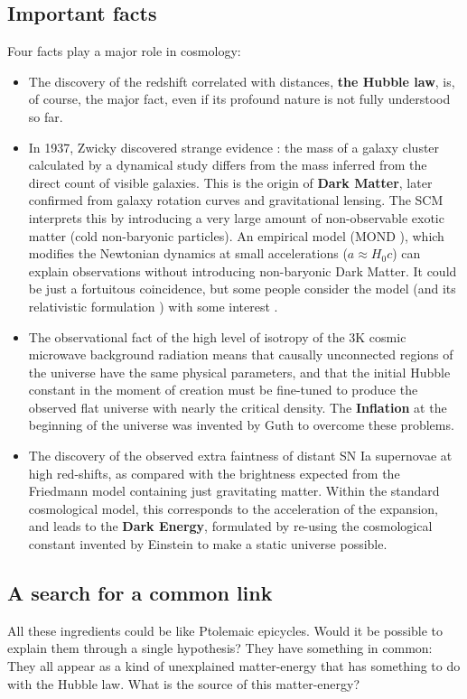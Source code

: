 \subsection{Important facts }
\label{sec5.2}
Four facts  play a major role in cosmology: 
\begin{itemize}
\item The discovery of the redshift correlated with distances, {\bf{the Hubble law}},  is, of course, the major fact, even if its profound nature is not fully understood so far.

\item In 1937, Zwicky discovered strange evidence  \cite{zwicky} : the mass of a galaxy cluster calculated by a dynamical study differs from the mass inferred from the direct count of visible galaxies. This is the origin of  {\bf {Dark Matter}}, later confirmed from galaxy rotation curves and gravitational lensing. The SCM interprets this  by introducing a very large amount of non-observable exotic matter (cold non-baryonic particles). 
An empirical model (MOND  \cite{mond}), which modifies the Newtonian dynamics at small accelerations ($a \approx H_0 c$) can explain observations without introducing non-baryonic Dark Matter. It could be just a fortuitous coincidence, but some people consider the model (and its relativistic formulation \cite{beken}) with some interest \cite{blanchet}.

\item The observational fact of the high level of isotropy of the 3K cosmic microwave background radiation means that causally unconnected regions of the universe have the same physical parameters,  and that the initial Hubble constant in the moment of creation must be fine-tuned to produce the observed  {{flat universe}}  with nearly the critical density. The  {\bf {Inflation}} at the beginning of the universe was invented by Guth \cite{guth} to overcome these problems. 

\item The discovery  \cite{perl,riess} of the observed extra faintness of distant SN Ia supernovae at high red-shifts, as compared with the brightness expected from the Friedmann model containing just gravitating matter. Within the standard cosmological model, this corresponds to the acceleration of the expansion, and leads to the {\bf{Dark Energy}}, formulated by re-using the cosmological constant invented by Einstein to make a static universe possible.
\end{itemize}

\subsection{A search for a common link }
\label{sec5.3}
 All these ingredients could be like Ptolemaic epicycles. Would it be possible to explain them through a single hypothesis? They have something in common: They all appear as a kind of unexplained matter-energy that has something to do with the Hubble law. What is the source of this matter-energy? 

